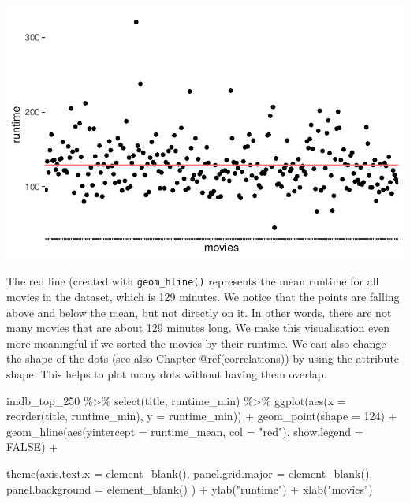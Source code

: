 \documentclass[
  letterpaper,
]{krantz}
\makeatletter
\newenvironment{Shaded}{\begin{snugshade}}{\end{snugshade}}
\newcommand{\AttributeTok}[1]{\textcolor[rgb]{0.40,0.45,0.13}{#1}}
\newcommand{\ConstantTok}[1]{\textcolor[rgb]{0.56,0.35,0.01}{#1}}
\newcommand{\DecValTok}[1]{\textcolor[rgb]{0.68,0.00,0.00}{#1}}
\newcommand{\FunctionTok}[1]{\textcolor[rgb]{0.28,0.35,0.67}{#1}}
\newcommand{\NormalTok}[1]{\textcolor[rgb]{0.00,0.23,0.31}{#1}}
\newcommand{\SpecialCharTok}[1]{\textcolor[rgb]{0.37,0.37,0.37}{#1}}
\newcommand{\StringTok}[1]{\textcolor[rgb]{0.13,0.47,0.30}{#1}}
\newenvironment{kframe}{%
\medskip{}
\setlength{\fboxsep}{.8em}
 \def\at@end@of@kframe{}%
 \ifinner\ifhmode%
  \def\at@end@of@kframe{\end{minipage}}%
  \begin{minipage}{\columnwidth}%
 \fi\fi%
 \def\FrameCommand##1{\hskip\@totalleftmargin \hskip-\fboxsep
 \colorbox{shadecolor}{##1}\hskip-\fboxsep
     \hskip-\linewidth \hskip-\@totalleftmargin \hskip\columnwidth}%
 \MakeFramed {\advance\hsize-\width
   \@totalleftmargin\z@ \linewidth\hsize
   \@setminipage}}%
 {\par\unskip\endMakeFramed%
 \at@end@of@kframe}
\renewenvironment{Shaded}{\begin{kframe}}{\end{kframe}}
\makeatother
\begin{document}
\includegraphics{08_descriptive_statistics_files/figure-pdf/sd-visualised-p1-1.pdf}

The red line (created with \texttt{geom\_hline()} represents the mean
runtime for all movies in the dataset, which is 129 minutes. We notice
that the points are falling above and below the mean, but not directly
on it. In other words, there are not many movies that are about 129
minutes long. We make this visualisation even more meaningful if we
sorted the movies by their runtime. We can also change the shape of the
dots (see also Chapter @ref(correlations)) by using the attribute shape.
This helps to plot many dots without having them overlap.

\begin{Shaded}
\begin{Highlighting}[]
\NormalTok{imdb\_top\_250 }\SpecialCharTok{\%\textgreater{}\%}
  \FunctionTok{select}\NormalTok{(title, runtime\_min) }\SpecialCharTok{\%\textgreater{}\%}
  \FunctionTok{ggplot}\NormalTok{(}\FunctionTok{aes}\NormalTok{(}\AttributeTok{x =} \FunctionTok{reorder}\NormalTok{(title, runtime\_min), }\AttributeTok{y =}\NormalTok{ runtime\_min)) }\SpecialCharTok{+}
  \FunctionTok{geom\_point}\NormalTok{(}\AttributeTok{shape =} \DecValTok{124}\NormalTok{) }\SpecialCharTok{+}
  \FunctionTok{geom\_hline}\NormalTok{(}\FunctionTok{aes}\NormalTok{(}\AttributeTok{yintercept =}\NormalTok{ runtime\_mean, }\AttributeTok{col =} \StringTok{"red"}\NormalTok{), }\AttributeTok{show.legend =} \ConstantTok{FALSE}\NormalTok{) }\SpecialCharTok{+}

  \FunctionTok{theme}\NormalTok{(}\AttributeTok{axis.text.x =} \FunctionTok{element\_blank}\NormalTok{(),}
        \AttributeTok{panel.grid.major =} \FunctionTok{element\_blank}\NormalTok{(),}
        \AttributeTok{panel.background =} \FunctionTok{element\_blank}\NormalTok{()}
\NormalTok{        ) }\SpecialCharTok{+}
  \FunctionTok{ylab}\NormalTok{(}\StringTok{"runtime"}\NormalTok{) }\SpecialCharTok{+}
  \FunctionTok{xlab}\NormalTok{(}\StringTok{"movies"}\NormalTok{)}
\end{Highlighting}
\end{Shaded}
\end{document}
